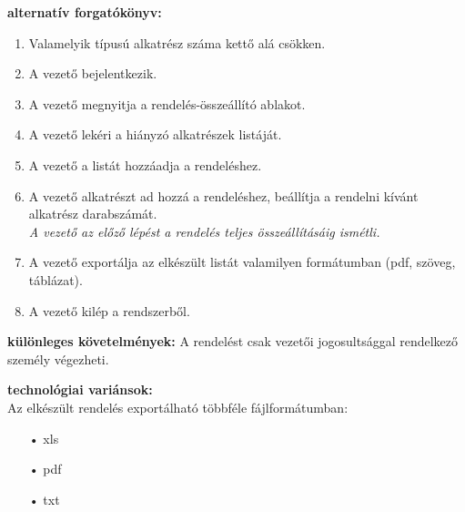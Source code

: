 \documentclass[12pt]{article}\usepackage[left=20mm,right=20mm,top=14mm,bottom=20mm]{geometry}
\begin{document}
\noindent\textbf{alternatív forgatókönyv: }
\begin{enumerate}
\item Valamelyik típusú alkatrész száma kettő alá csökken.
\item A vezető bejelentkezik.
\item A vezető megnyitja a rendelés-összeállító ablakot.
\item A vezető lekéri a hiányzó alkatrészek listáját.
\item A vezető a listát hozzáadja a rendeléshez.
\item A vezető alkatrészt ad hozzá a rendeléshez, beállítja a rendelni kívánt alkatrész darabszámát. \\
\textit{A vezető az előző lépést a rendelés teljes összeállításáig ismétli.}
\item A vezető exportálja az elkészült listát valamilyen formátumban (pdf, szöveg, táblázat).
\item A vezető kilép a rendszerből.
\end{enumerate}
\vspace{4mm}

\noindent\textbf{különleges követelmények: } A rendelést csak vezetői jogosultsággal rendelkező személy végezheti.
\vspace{4mm}

\noindent\textbf{technológiai variánsok: } \\Az elkészült rendelés exportálható többféle fájlformátumban:
\vspace*{-3mm}
\begin{itemize}
\item[•] xls
\item[•] pdf
\item[•] txt
\end{itemize}
\end{document}
